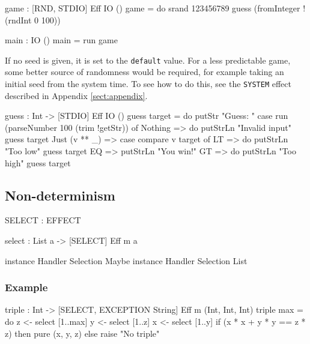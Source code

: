 \begin{code}
game : { [RND, STDIO] } Eff IO ()
game = do srand 123456789
          guess (fromInteger !(rndInt 0 100))

main : IO ()
main = run game
\end{code}

\noindent
If no seed is given, it is set to the \texttt{default} value. For a less
predictable game, some better source of randomness would be required, for
example taking an initial seed from the system time. To see how to do
this, see the \texttt{SYSTEM} effect described in Appendix \ref{sect:appendix}.

\begin{code}[frame=single,float,label=eff:game,caption={Guessing Game}]
guess : Int -> { [STDIO] } Eff IO ()
guess target
    = do putStr "Guess: "
         case run (parseNumber 100 (trim !getStr)) of
              Nothing => do putStrLn "Invalid input"
                            guess target
              Just (v ** _) =>
                         case compare v target of
                             LT => do putStrLn "Too low"
                                      guess target
                             EQ => putStrLn "You win!"
                             GT => do putStrLn "Too high"
                                      guess target
\end{code}

\subsection{Non-determinism}

\begin{code}[float=h,frame=single,label=eff:select,caption={Non-determinism Effect}]
SELECT : EFFECT

select : List a -> { [SELECT] } Eff m a 

instance Handler Selection Maybe
instance Handler Selection List
\end{code}

\subsubsection*{Example}

\begin{code}
triple : Int -> { [SELECT, EXCEPTION String] } Eff m (Int, Int, Int)
triple max = do z <- select [1..max]
                y <- select [1..z]
                x <- select [1..y]
                if (x * x + y * y == z * z)
                   then pure (x, y, z)
                   else raise "No triple"
\end{code}

